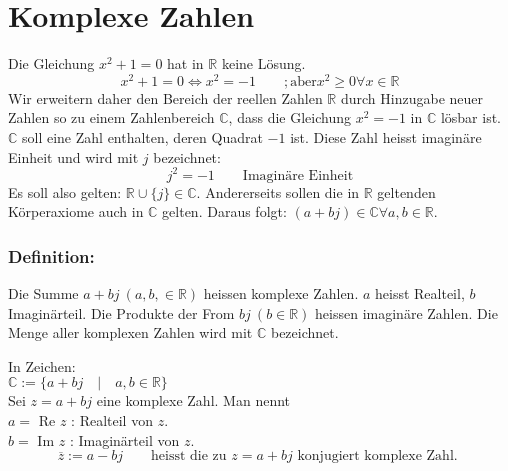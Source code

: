 



\section{Komplexe Zahlen}
Die Gleichung $x^2 + 1 = 0$ hat in $\mathbb{R}$ keine Lösung. 
\[ x^2 + 1 = 0 \Leftrightarrow x^2 = -1 \qquad ; \text{aber} x^2 \geq 0 \forall x \in \mathbb{R} \]
Wir erweitern daher den Bereich der reellen Zahlen $\mathbb{R}$ durch Hinzugabe neuer Zahlen so zu einem Zahlenbereich $\mathbb{C}$, dass die Gleichung $x^2 = -1$ in $\mathbb{C}$ lösbar ist. $\mathbb{C}$ soll eine Zahl enthalten, deren Quadrat $-1$ ist. Diese Zahl heisst imaginäre Einheit und wird mit $j$ bezeichnet: 
\[ \boxed{j^2 = -1} \qquad \text{Imaginäre Einheit} \]
Es soll also gelten: $\mathbb{R} \cup \{j\} \in \mathbb{C}$. 
Andererseits sollen die in $\mathbb{R}$ geltenden Körperaxiome auch in $\mathbb{C}$ gelten. 
Daraus folgt: $(a + b j) \in \mathbb{C} \forall a, b \in \mathbb{R}$. 
\subsubsection{Definition:}
\begin{framed}\noindent
Die Summe $a + b j~(a, b, \in \mathbb{R})$ heissen komplexe Zahlen. $a$ heisst Realteil, $b$ Imaginärteil. Die Produkte der From $b j~(b \in \mathbb{R})$ heissen imaginäre Zahlen. Die Menge aller komplexen Zahlen wird mit $\mathbb{C}$ bezeichnet. 
\end{framed}
In Zeichen: 
\\$ \mathbb{C}:=\{a + b j \quad | \quad a, b \in \mathbb{R}\} $
\\Sei $z = a + b j$ eine komplexe Zahl. Man nennt
\\$a = $ Re $ z$ : Realteil von $z$. 
\\$b = $ Im $ z$ : Imaginärteil von $z$. 
\[ \boxed{\overline{z} := a - b j} \qquad%
\text{heisst die zu $z = a + b j$ konjugiert komplexe Zahl. } \]

